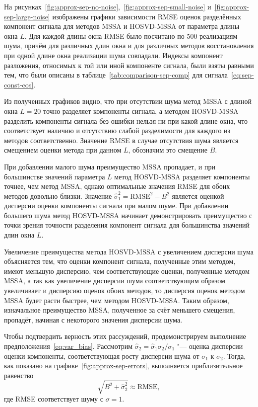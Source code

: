 \documentclass[specialist,
    substylefile = spbu.rtx,
    subf,href,colorlinks=true, 12pt]{disser}
\theoremstyle{plain}
\theoremstyle{definition}
\theoremstyle{remark}
\begin{document}
    На рисунках~\ref{fig:approx-sep-no-noise},~\ref{fig:approx-sep-small-noise} и~\ref{fig:approx-sep-large-noise}
    изображены графики зависимости RMSE оценок разделённых компонент сигнала для методов MSSA и HOSVD-MSSA от
    параметра длины окна $L$.
    Для каждой длины окна RMSE было посчитано по 500 реализациям шума, причём для различных длин окна
    и для различных методов восстановления при одной длине окна реализации шума совпадали.
    Индексы компонент разложения, относимых к той или иной компоненте сигнала, были взяты равными тем, что
    были описаны в таблице~\ref{tab:comparison-sep-comp} для сигнала~\eqref{eq:sep-const-cos}.

    Из полученных графиков видно, что при отсутствии шума метод MSSA с длиной окна $L=20$ точно разделяет
    компоненты сигнала, а методом HOSVD-MSSA разделить компоненты сигнала без ошибки нельзя ни при какой длине окна,
    что соответствует наличию и отсутствию слабой разделимости для каждого из методов соответственно.
    Значение RMSE в случае отсутствия шума является смещением оценки метода при данном $L$, обозначим
    это смещение $B$.

    При добавлении малого шума преимущество MSSA пропадает, и при большинстве значений параметра $L$ метод
    HOSVD-MSSA разделяет компоненты точнее, чем метод MSSA, однако оптимальные значения RMSE для обоих методов
    довольно близки.
    Значение $\hat{\sigma}_1^2 = \text{RMSE}^2 - B^2$ является оценкой дисперсии оценки компоненты сигнала при
    малом шуме.
    При добавлении большего шума метод HOSVD-MSSA начинает демонстрировать преимущество с точки зрения точности
    разделения компонент сигнала для большинства значений длин окна $L$.

    Увеличение преимущества метода HOSVD-MSSA с увеличением дисперсии шума объясняется тем, что оценки
    компонент сигнала, полученные этим методом, имеют меньшую дисперсию, чем соответствующие оценки, полученные
    методом MSSA, а так как увеличение дисперсии шума соответствующим образом увеличивает и дисперсию оценок
    обоих методов, то дисперсия оценок методом MSSA будет расти быстрее, чем методом HOSVD-MSSA.
    Таким образом, изначальное преимущество MSSA, полученное за счёт меньшего смещения, пропадёт, начиная
    с некоторого значения дисперсии шума.
    
    Чтобы подтвердить верность этих рассуждений, продемонстрируем выполнение предположения~\eqref{eq:var_bias}. Рассмотрим $\hat{\sigma}_2 = \hat{\sigma}_1 \sigma_2 / \sigma_1$
    "--- оценка дисперсии оценки компоненты, соответствующая росту дисперсии шума от $\sigma_1$ к $\sigma_2$.
    Тогда, как показано на графике~\ref{fig:approx-sep-errors}, выполняется приблизительное равенство
    \[
        \sqrt{B^2 + \hat{\sigma}_2^2} \approx \text{RMSE},
    \]
    где RMSE соответствует шуму с $\sigma = 1$.
\end{document}

